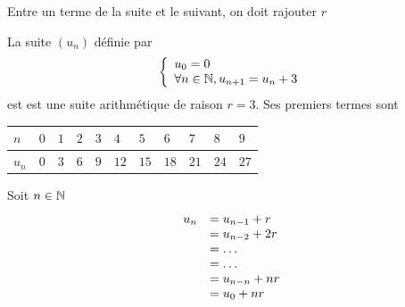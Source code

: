 \begin{remarque}
Entre un terme de la suite et le suivant, on doit rajouter $r$
\end{remarque}
\begin{exemple}
La suite $(u_n)$ définie par
$$\left\{ \begin{array}{l}
  u_0 = 0\\
  \forall n \in \mathbb{N}, u_{n+1} = u_n + 3
\end{array}\right.$$
est est une suite arithmétique de raison $r=3$. \newline Ses premiers termes sont \newline
\begin{tabularx}{\linewidth}{| X | X | X | X | X | X | X | X | X | X | X |}
\hline
   $n$ & $0$ & $1$ & $2$ & $3$ & $4$ & $5$ & $6$ & $7$ & $8$ & $9$ \\ \hline
   $u_n$ & $0$ & $3$ & $6$ & $9$ & $12$ & $15$ & $18$ & $21$ & $24$ & $27$ \\ \hline
\end{tabularx}
\end{exemple}
\newline

\begin{preuve}
Soit $n\in \mathbb{N}$
$$\begin{array}{l l}
u_n & = u_{n-1} + r\\
& = u_{n-2} + 2r\\
& =\ldots\\
& =\ldots \\
& =u_{n-n} + nr\\
&=u_0 + nr\\
\end{array}$$
\end{preuve}
\newline


